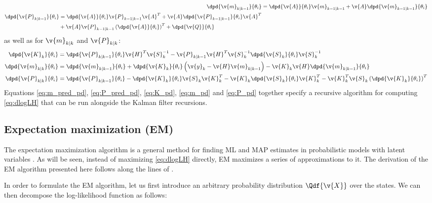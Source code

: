 \begin{align}
	\dpd{\v{m}_{k|k-1}}{\theta_i}&=\dpd{\v{A}}{\theta_i}\v{m}_{k-1|k-1}+\v{A}\dpd{\v{m}_{k-1|k-1}}{\theta_i} \label{eq:m_pred_pd}\\
	\begin{split}
	\dpd{\v{P}_{k|k-1}}{\theta_i}&=\dpd{\v{A}}{\theta_i}\v{P}_{k-1|k-1}\v{A}^T+\v{A}\dpd{\v{P}_{k-1|k-1}}{\theta_i}\v{A}^T\\
	&+\v{A}\v{P}_{k-1|k-1}\left(\dpd{\v{A}}{\theta_i}\right)^T+\dpd{\v{Q}}{\theta_i} \label{eq:P_pred_pd}
	\end{split}
\end{align}
as well as for $\v{m}_{k|k}$ and $\v{P}_{k|k}$:
\begin{align}
	\dpd{\v{K}_k}{\theta_i}&=\dpd{\v{P}_{k|k-1}}{\theta_i}\v{H}^T\v{S}_{k}^{-1}-\v{P}_{k|k-1}\v{H}^T\v{S}_{k}^{-1}\dpd{\v{S}_k}{\theta_i}\v{S}_{k}^{-1}
	\label{eq:K_pd}\\
	\dpd{\v{m}_{k|k}}{\theta_i}&=\dpd{\v{m}_{k|k-1}}{\theta_i}+\dpd{\v{K}_k}{\theta_i}\left(\v{y}_k-\v{H}\v{m}_{k|k-1}\right)-\v{K}_k\v{H}\dpd{\v{m}_{k|k-1}}{\theta_i}
	\label{eq:m_pd}\\
	\dpd{\v{P}_{k|k}}{\theta_i}&=\dpd{\v{P}_{k|k-1}}{\theta_i}-\dpd{\v{K}_k}{\theta_i}\v{S}_{k}\v{K}_{k}^T-\v{K}_{k}\dpd{\v{S}_k}{\theta_i}\v{K}_{k}^T-\v{K}_{k}^T\v{S}_{k}\left(\dpd{\v{K}_k}{\theta_i}\right)^T
	\label{eq:P_pd}
	\end{align}
Equations \eqref{eq:m_pred_pd}, \eqref{eq:P_pred_pd}, \eqref{eq:K_pd}, \eqref{eq:m_pd} and \eqref{eq:P_pd} together specify
a recursive algorithm for computing \eqref{eq:dlogLH} that can be run alongside the Kalman filter recursions.  

\subsection{Expectation maximization (EM)}

The expectation maximization algorithm \parencite{Dempster1977} is a general
method for finding ML and MAP estimates in probabilistic models with
latent variables \parencite{Bishop2006}. As will be seen, instead of maximizing
\eqref{eq:dlogLH} directly, EM maximizes a series of approximations to it.
The derivation of the EM algorithm presented here follows along the lines
of \parencite{Bishop2006}.
 
In order to formulate the EM algorithm, let us first introduce an arbitrary probability distribution $\Qdf{\v{X}}$
over the states. We can then decompose the log-likelihood function as follows:

